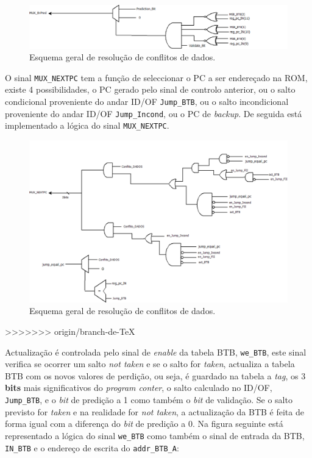 \documentclass[11pt]{article}
\numberwithin{equation}{section}
\begin{document}
\begin{figure}[H]
	\centering
	\includegraphics[keepaspectratio=true, scale=0.27]{imagens/Muxbrprd}
	\vspace{-0.5em}
	\caption{Esquema geral de resolução de conflitos de dados.}
	\vspace{-0.8em}
\end{figure}

O sinal \texttt{MUX\_NEXTPC} tem a função de seleccionar o PC a ser endereçado na ROM, existe 4 possibilidades, o PC gerado pelo sinal de controlo anterior, ou o salto condicional proveniente do andar ID/OF \texttt{Jump\_BTB}, ou o salto incondicional proveniente do andar ID/OF \texttt{Jump\_Incond}, ou o PC de \textit{backup}. De seguida está implementado a lógica do sinal  \texttt{MUX\_NEXTPC}.

\begin{figure}[H]
	\centering
	\includegraphics[keepaspectratio=true, scale=0.27]{imagens/MuxNEXTPC}
	\vspace{-0.5em}
	\caption{Esquema geral de resolução de conflitos de dados.}
	\vspace{-0.8em}
\end{figure}
>>>>>>> origin/branch-de-TeX

Actualização é controlada pelo sinal de \textit{enable} da tabela BTB, \texttt{we\_BTB}, este sinal verifica se ocorrer um salto \textit{not taken} e se o salto for \textit{taken}, actualiza a tabela BTB com os novos valores de perdição, ou seja, é guardado na tabela a \textit{tag}, os 3 \textbf{bits} mais significativos do \textit{program conter}, o salto calculado no ID/OF, \texttt{Jump\_BTB}, e o \textit{bit} de predição a 1 como também o \textit{bit} de validação. Se o salto previsto for \textit{taken} e na realidade for \textit{not taken}, a actualização da BTB é feita de forma igual com a diferença do \textit{bit} de predição a 0.
Na figura seguinte está representado a lógica do sinal \texttt{we\_BTB} como também o sinal de entrada da BTB, \texttt{IN\_BTB} e o endereço de escrita do \texttt{addr\_BTB\_A}:
\end{document}
